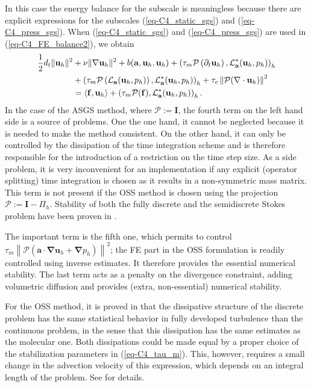 In this case the energy balance for the subscale is meaningless because there are explicit expressions for the subscales (\ref{eq-C4_static_sgs}) and (\ref{eq-C4_press_sgs}). When (\ref{eq-C4_static_sgs}) and (\ref{eq-C4_press_sgs}) are used in (\ref{eq-C4_FE_balance2}), we obtain
\begin{align}
\label{eq-C4_static_energy}
\frac{1}{2}d_t\|{\bf u}_h\|^2
& +\nu\|\nabla{\bf u}_h\|^2 + b({\bf a},{\bf u}_h,{\bf u}_h)  
  + \left( \tau_{m} \mathcal{P} \left(  \partial_t {\bf u}_h \right), \mathcal{L}^*_{{\bf a}} ( {\bf u}_{h},p_h)\right)_h \\ \nonumber
& + \left(\tau_{m} \mathcal{P} \left( \mathcal{L}_{{\bf a}} ( {\bf u}_{h},p_h) \right),\mathcal{L}^*_{{\bf a}}({\bf u}_h,p_h)\right)_h
+ \tau_{c} \left\| \mathcal{P}(\nabla \cdot {\bf u}_{h})\right\|^{2}\\ \nonumber
& = \langle\mathbf{f},\mathbf{u}_h\rangle + \left(\tau_m \mathcal{P}(\mathbf{f}),\mathcal{L}^*_{{\bf a}}({\bf u}_h,p_h)\right)_h.
\end{align}
In the case of the ASGS method, where $\mathcal{P}:=\mathbf{I}$, the fourth term on the left hand side is a source of problems. One the one hand, it cannot be neglected because it is needed to make the method consistent. On the other hand, it can only be controlled by the dissipation of the time integration scheme and is therefore responsible for the introduction of a restriction on the time step size. As a side problem, it is very inconvenient for an implementation if any explicit (operator splitting) time integration is chosen as it results in a non-symmetric mass matrix. This term is not present if the OSS method is chosen using the projection $\mathcal{P}:=\mathbf{I}-\Pi_h$. Stability of both the fully discrete and the semidiscrete Stokes problem have been proven in \cite{Badia2009a}.

The important term is the fifth one, which permits to control
$ \tau_{m} \left\| \mathcal{P} \left( \mathbf{a}\cdot \mathbf{\nabla u}_{h}+\mathbf{\nabla }p_{h}\right) \right\|^{2} $; the FE part in the OSS formulation is readily controlled using inverse estimates. It therefore provides the essential numerical stability. The last term acts as a penalty on the divergence constraint, adding volumetric diffusion and provides (extra, non-essential) numerical stability.

For the OSS method, it is proved in \cite{guasch-codina-13} that the dissipative structure of the discrete problem has the same statistical behavior in fully developed turbulence than the continuous problem, in the sense that this dissipation has the same estimates as the molecular one. Both dissipations could be made equal by a proper choice of the stabilization parameters in (\ref{eq-C4_tau_m}). This, however, requires a small change in the advection velocity of this expression, which depends on an integral length of the problem. See \cite{guasch-codina-13} for details.

